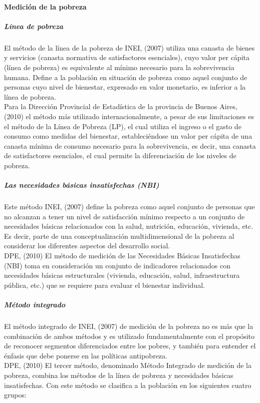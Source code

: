     \paragraph{Medición de la pobreza}

  \subparagraph{Línea de pobreza}

  El método de la línea de la pobreza de INEI, (2007) utiliza una canasta de bienes y servicios (canasta normativa de satisfactores esenciales), cuyo valor per cápita (línea de pobreza) es equivalente al mínimo necesario para la sobrevivencia humana. Define a la población en situación de pobreza como aquel conjunto de personas cuyo nivel de bienestar, expresado en valor monetario, es inferior a la línea de pobreza.\\
Para la Dirección Provincial de Estadística de la provincia de Buenos Aires, (2010) el método más utilizado internacionalmente, a pesar de sus limitaciones es el método de la Línea de Pobreza (LP), el cual utiliza el ingreso o el gasto de consumo como medidas del bienestar, estableciéndose un valor per cápita de una canasta mínima de consumo necesario para la sobrevivencia, es decir, una canasta de satisfactores esenciales, el cual permite la diferenciación de los niveles de pobreza.

  \subparagraph{Las necesidades básicas insatisfechas (NBI)}

Este método INEI, (2007) define la pobreza como aquel conjunto de personas que no alcanzan a tener un nivel de satisfacción mínimo respecto a un conjunto de necesidades básicas relacionados con la salud, nutrición, educación, vivienda, etc. Es decir, parte de una conceptualización multidimensional de la pobreza al considerar los diferentes aspectos del desarrollo social. \\
DPE, (2010) El método de medición de las Necesidades Básicas Insatisfechas (NBI) toma en consideración un conjunto de indicadores relacionados con necesidades básicas estructurales (vivienda, educación, salud, infraestructura pública, etc.) que se requiere para evaluar el bienestar individual.

  \subparagraph{Método integrado}

El método integrado de INEI, (2007) de medición de la pobreza no es más que la combinación de ambos métodos y es utilizado fundamentalmente con el propósito de reconocer segmentos diferenciados entre los pobres, y también para entender el énfasis que debe ponerse en las políticas antipobreza.\\
DPE, (2010) El tercer método, denominado Método Integrado de medición de la pobreza, combina los métodos de la línea de pobreza y necesidades básicas insatisfechas. Con este método se clasifica a la población en los siguientes cuatro grupos: 

